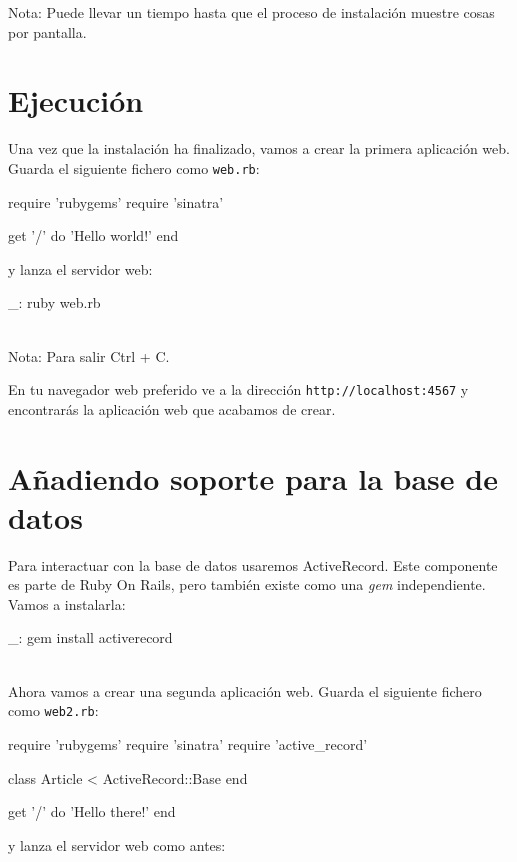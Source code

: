 Nota: Puede llevar un tiempo hasta que el proceso de instalación muestre cosas por pantalla.


\section{Ejecución}

Una vez que la instalación ha finalizado, vamos a crear la primera aplicación web. Guarda el siguiente fichero como \texttt{web.rb}:

\begin{rubycode}
require 'rubygems'
require 'sinatra'

get '/' do
  'Hello world!'
end
\end{rubycode}

y lanza el servidor web:

\begin{bashcode}
_: ruby web.rb
\end{bashcode}
\\

Nota: Para salir Ctrl + C.

En tu navegador web preferido ve a la dirección \texttt{http://localhost:4567} y encontrarás la aplicación web que acabamos de crear.


\section{Añadiendo soporte para la base de datos}

Para interactuar con la base de datos usaremos ActiveRecord. Este componente es parte de Ruby On Rails, pero también existe como una \emph{gem} independiente. Vamos a instalarla:

\begin{bashcode}
_: gem install activerecord
\end{bashcode}
\\

Ahora vamos a crear una segunda aplicación web. Guarda el siguiente fichero como \texttt{web2.rb}:

\begin{rubycode}
require 'rubygems'
require 'sinatra'
require 'active_record'

class Article < ActiveRecord::Base
end

get '/' do
   'Hello there!'
end
\end{rubycode}

y lanza el servidor web como antes:

